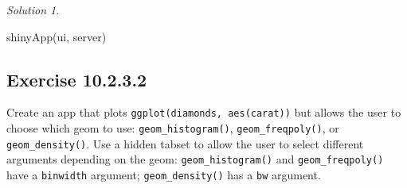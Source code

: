 \documentclass[
]{book}
\newenvironment{Shaded}{\begin{snugshade}}{\end{snugshade}}
\newcommand{\FunctionTok}[1]{\textcolor[rgb]{0.00,0.00,0.00}{#1}}
\newcommand{\NormalTok}[1]{#1}
\theoremstyle{definition}
\theoremstyle{definition}
\theoremstyle{definition}
\theoremstyle{definition}
\theoremstyle{remark}
\newtheorem*{solution}{Solution}
\begin{document}
\begin{solution}
\begin{Shaded}
\begin{Highlighting}[]
\FunctionTok{shinyApp}\NormalTok{(ui, server)}
\end{Highlighting}
\end{Shaded}

\end{solution}

\hypertarget{exercise-10.2.3.2}{%
\subsection*{Exercise 10.2.3.2}\label{exercise-10.2.3.2}}

Create an app that plots \texttt{ggplot(diamonds,\ aes(carat))} but allows the user to choose which geom to use: \texttt{geom\_histogram()}, \texttt{geom\_freqpoly()}, or \texttt{geom\_density()}. Use a hidden tabset to allow the user to select different arguments depending on the geom: \texttt{geom\_histogram()} and \texttt{geom\_freqpoly()} have a \texttt{binwidth} argument; \texttt{geom\_density()} has a \texttt{bw} argument.
\end{document}
